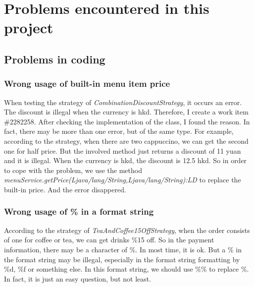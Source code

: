 \documentclass[a4paper]{report}
\begin{document}
\chapter{Problems encountered in this project}
\section{Problems in coding}
\subsection{Wrong usage of built-in menu item price}
\par When testing the strategy of \emph{CombinationDiscountStrategy}, it occurs an error. The discount is illegal when the currency is hkd. Therefore, I create a work item \#2282258. After checking the implementation of the class, I found the reason. In fact, there may be more than one error, but of the same type. For example, according to the strategy, when there are two cappuccino, we can get the second one for half price. But the involved method just returns a discount of 11 yuan and it is illegal. When the currency is hkd, the discount is 12.5 hkd. So in order to cope with the problem, we use the method \emph{menuService.getPrice(Ljava/lang/String,Ljava/lang/String):LD} to replace the built-in price. And the error disappered.
\subsection{Wrong usage of \% in a format string}
\par According to the strategy of \emph{TeaAndCoffee15OffStrategy}, when the order consists of one for coffee or tea, we can get drinks \%15 off. So in the payment information, there may be a character of \%. In most time, it is ok. But a \% in the format string may be illegal, especially in the format string formatting by \%d, \%f or something else. In this format string, we should use \%\% to replace \%. In fact, it is just an easy question, but not least.
\end{document}
